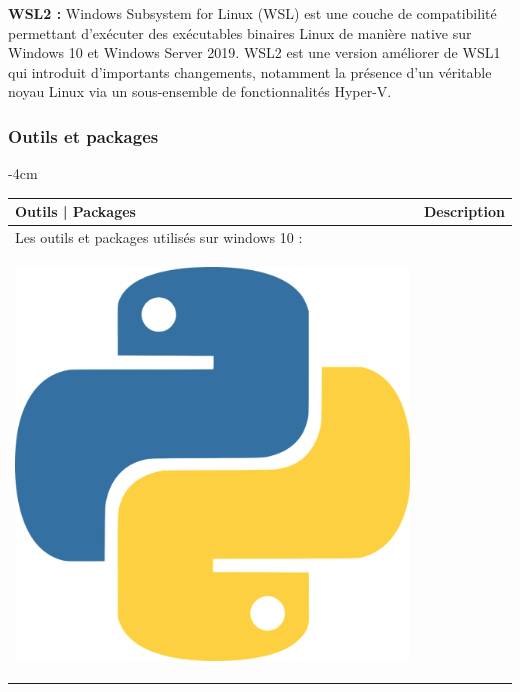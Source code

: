 \textbf{WSL2 :} Windows Subsystem for Linux (WSL) est une couche de compatibilité permettant d'exécuter des exécutables binaires Linux de manière native sur Windows 10 et Windows Server 2019. WSL2 est une version améliorer de WSL1 qui introduit d'importants changements, notamment la présence d'un véritable noyau Linux \cite{craigloewen_msft} via un sous-ensemble de fonctionnalités Hyper-V. 

\subsubsection{Outils et packages}

\begin{table}[H]
	\centering
	\addtolength{\leftskip} {-4cm}
	\addtolength{\rightskip}{-4.5cm}
	\begin{tabular}{|m{5cm}|m{14cm}|}
	\hline
	\rowcolor{blueforest}
	\color{white} \textbf{Outils | Packages} & \color{white} \textbf{Description}  \\
	\hline\hline
	\multicolumn{2}{|m{19cm}|}{\centering Les outils et packages utilisés sur windows 10 : }\\ \hline
	\begin{center}
	    \begin{minipage}{.3\textwidth}
      \includegraphics[width=\textwidth]{images/chapitre7/python.png}

\end{minipage}
\end{center}
\end{tabular}
\end{table}
